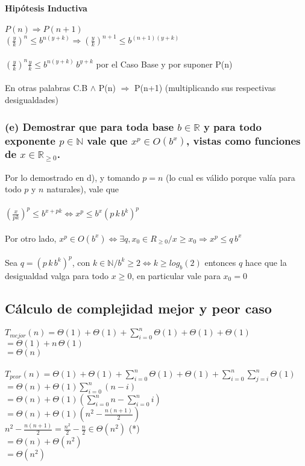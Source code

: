 \documentclass[10pt, a4paper]{article}
\begin{document}
\paragraph*{Hipótesis Inductiva}
$P(n) \Rightarrow P(n+1)$ \\

$(\frac{y}{k})^n \le b^{n(y+k)} \Rightarrow (\frac{y}{k})^{n+1} \le b^{(n+1)(y+k)}$\\ \\
$(\frac{y}{k})^n \frac{y}{k} \le b^{n(y+k)} \, b^{y+k}$ por el Caso Base y por suponer P(n)\\ \\
En otras palabras C.B $\wedge$ P(n) $\Rightarrow$ P(n+1) (multiplicando sus respectivas desigualdades)

\subsubsection*{(e) Demostrar que para toda base $b \in \mathbb{R}$ y para todo exponente $p \in \mathbb{N}$ vale que $x^p \in O(b^x)$, vistas como funciones de $x \in \mathbb R_{\ge 0}$.}

Por lo demostrado en d), y tomando $p=n$ (lo cual es válido porque valía para todo $p$ y $n$ naturales), vale que \\ \\
$(\frac{x}{pk})^p \le b^{x + pk} \Leftrightarrow \boxed{x^p \le b^x (p\,k\,b^k)^p}$\\ \\
Por otro lado, $x^p \in O(b^x) \Leftrightarrow \exists q, x_0 \in R_{\ge 0} / x\ge x_0 \Rightarrow x^p \le q \, b^x$\\ \\
Sea $q = (p\,k\,b^k)^p$, con $k \in \mathbb{N} / b^k \ge 2 \Leftrightarrow k \ge log_{b}(2)$ entonces $q$ hace que la desigualdad valga para todo $x \ge 0$, en particular vale para $x_0 = 0$

\subsection{Cálculo de complejidad mejor y peor caso}

$T_{mejor}(n) = \Theta (1) + \Theta (1) + \sum_{i=0}^{n} \Theta (1) +\Theta (1) + \Theta (1)$\\
 $= \Theta (1) + n \, \Theta (1)$\\
 $= \Theta (n)$\\ \\
$T_{peor}(n) = \Theta (1) + \Theta (1) + \sum_{i=0}^{n} \Theta (1) +\Theta (1) + \sum_{i=0}^{n} \sum_{j=i}^{n} \Theta (1)$\\
$= \Theta (n) +\Theta (1) \sum_{i=0}^{n}(n-i)$ \\
$= \Theta (n) +\Theta (1) (\sum_{i=0}^{n}n - \sum_{i=0}^{n}i)$\\
$= \Theta (n) +\Theta (1) (n^2 - \frac{n(n+1)}{2})$\\
$n^2 - \frac{n(n+1)}{2} = \frac{n^2}{2} - \frac{n}{2} \in \Theta (n^2)$ (*)\\
$= \Theta (n) +\Theta (n^2)$\\
$=\Theta (n^2)$\\ \\
\end{document}
